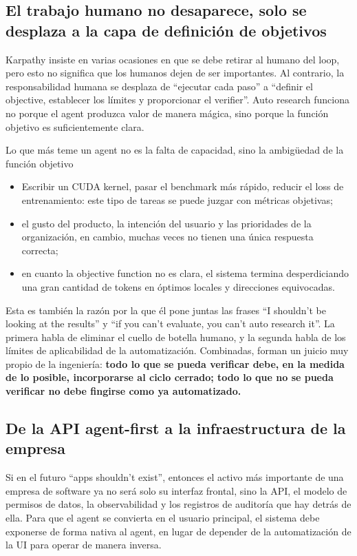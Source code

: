\documentclass[a4paper]{article}
\begin{document}
\subsection{El trabajo humano no desaparece, solo se desplaza a la capa de definición de objetivos}
Karpathy insiste en varias ocasiones en que se debe retirar al humano del loop, pero esto no significa que los humanos dejen de ser importantes. Al contrario, la responsabilidad humana se desplaza de ``ejecutar cada paso'' a ``definir el objective, establecer los límites y proporcionar el verifier''. Auto research funciona no porque el agent produzca valor de manera mágica, sino porque la función objetivo es suficientemente clara.

\begin{importantbox}{Lo que más teme un agent no es la falta de capacidad, sino la ambigüedad de la función objetivo}
\begin{itemize}
    \item Escribir un CUDA kernel, pasar el benchmark más rápido, reducir el loss de entrenamiento: este tipo de tareas se puede juzgar con métricas objetivas;
    \item el gusto del producto, la intención del usuario y las prioridades de la organización, en cambio, muchas veces no tienen una única respuesta correcta;
    \item en cuanto la objective function no es clara, el sistema termina desperdiciando una gran cantidad de tokens en óptimos locales y direcciones equivocadas.
\end{itemize}
\end{importantbox}

Esta es también la razón por la que él pone juntas las frases ``I shouldn't be looking at the results'' y ``if you can't evaluate, you can't auto research it''. La primera habla de eliminar el cuello de botella humano, y la segunda habla de los límites de aplicabilidad de la automatización. Combinadas, forman un juicio muy propio de la ingeniería: \textbf{todo lo que se pueda verificar debe, en la medida de lo posible, incorporarse al ciclo cerrado; todo lo que no se pueda verificar no debe fingirse como ya automatizado.}

\subsection{De la API agent-first a la infraestructura de la empresa}
Si en el futuro ``apps shouldn't exist'', entonces el activo más importante de una empresa de software ya no será solo su interfaz frontal, sino la API, el modelo de permisos de datos, la observabilidad y los registros de auditoría que hay detrás de ella. Para que el agent se convierta en el usuario principal, el sistema debe exponerse de forma nativa al agent, en lugar de depender de la automatización de la UI para operar de manera inversa.
\end{document}

